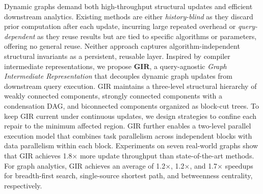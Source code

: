 Dynamic graphs demand both high-throughput structural updates and efficient downstream analytics. 
Existing methods are either \textit{history-blind} as they discard prior computation after each update, incurring large repeated overhead
or \textit{query-dependent} as they reuse results but are tied to specific algorithms or parameters, offering no general
reuse. 
Neither approach captures algorithm-independent structural invariants as a persistent, reusable layer.
Inspired by compiler intermediate representations, we propose \textbf{GIR}, a
query-agnostic \emph{Graph Intermediate Representation} that decouples dynamic
graph updates from downstream query execution. GIR maintains a three-level
structural hierarchy of weakly connected components, strongly connected
components with a condensation DAG, and biconnected components
organized as block-cut trees. To keep GIR current under continuous updates,
we design strategies to confine each repair to the minimum affected region. GIR further enables a two-level parallel execution model that combines task parallelism across
independent blocks with data parallelism within each block. 
Experiments on seven real-world graphs show that GIR achieves 1.8$\times$ more  update throughput than state-of-the-art methods.
For graph analytics, GIR achieves an average of 1.2$\times$, 1.2$\times$, and 1.7$\times$ speedups for breadth-first search, single-source shortest path, and betweenness centrality, respectively.